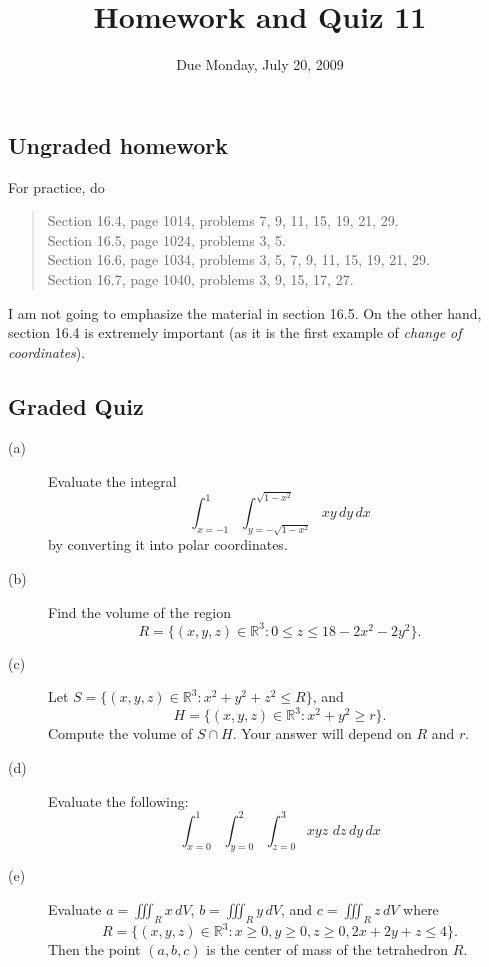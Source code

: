 \documentclass[12pt]{article}
\title{Homework and Quiz 11}
\date{Due Monday, July 20, 2009}
\newcommand{\R}{\mathbb{R}}
\begin{document}
\maketitle

\subsection*{Ungraded homework}

For practice, do
\begin{quote}
  Section 16.4, page 1014, problems 7, 9, 11, 15, 19, 21, 29. \\
  Section 16.5, page 1024, problems 3, 5. \\
  Section 16.6, page 1034, problems 3, 5, 7, 9, 11, 15, 19, 21, 29. \\
  Section 16.7, page 1040, problems 3, 9, 15, 17, 27. 
\end{quote}
I am not going to emphasize the material in section 16.5.  On the
other hand, section 16.4 is extremely important (as it is the first
example of \textit{change of coordinates}).
\vfill

\subsection*{Graded Quiz}

\begin{description}
\item[(a)] Evaluate the integral
$$
\int_{x = -1}^{1} \int_{y = -\sqrt{1 - x^2}}^{\sqrt{1-x^2}} xy \, dy \, dx
$$
by converting it into polar coordinates.
\vfill
\item[(b)] Find the volume of the region
$$
R = \{ (x,y,z) \in \R^3 : 0 \leq z \leq 18 - 2x^2 - 2y^2 \}.
$$
\vfill
\item[(c)] Let $S = \{ (x,y,z) \in \R^3 : x^2 + y^2 + z^2 \leq R \}$, and
$$
H = \{ (x,y,z) \in \R^3 : x^2 + y^2 \geq r \}.
$$
Compute the volume of $S \cap H$.  Your answer will depend on $R$ and $r$.
\vfill
\item[(d)] Evaluate the following:
$$
\int_{x = 0}^1 \int_{y = 0}^2 \int_{z = 0}^3 xyz \,\, dz \, dy \, dx
$$
\vfill
\item[(e)] Evaluate $a = \iiint_R x\, dV$, $b = \iiint_R y\, dV$, and $c = \iiint_R z\, dV$ where 
$$
R = \{(x,y,z) \in \R^3 : x \geq 0, y \geq 0, z \geq 0, 2x + 2y + z \leq 4 \}.
$$
Then the point $(a,b,c)$ is the center of mass of the tetrahedron $R$.
\vfill
\end{description}
\end{document}
